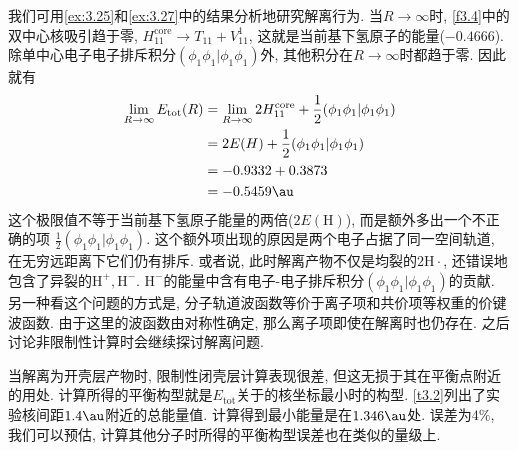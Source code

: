 我们可用\autoref{ex:3.25}和\autoref{ex:3.27}中的结果分析地研究解离行为. 
当$R\to\infty$时, 
\autoref{f3.4}中的双中心核吸引趋于零, 
$H_{11}^\mathrm{core}\to T_{11}+V_{11}^1$, 
这就是当前基下氢原子的能量($-0.4666$). 
除单中心电子电子排斥积分$(\phi_1\phi_1|\phi_1\phi_1)$外, 
其他积分在$R\to \infty$时都趋于零. 
因此就有
\begin{align*}
	\lim_{R\to\infty} E_\mathrm{tot}(R) & = \lim_{R\to\infty} 2H_{11}^\mathrm{core} + \frac{1}{2}(\phi_1\phi_1|\phi_1\phi_1) \\
	& = 2E(H) + \frac{1}{2}(\phi_1\phi_1|\phi_1\phi_1)                                   \\
	& = -0.9332 + 0.3873                                                                 \\
	& = -0.5459\au
\end{align*}
这个极限值不等于当前基下氢原子能量的两倍($2E(\mathrm{H})$), 
而是额外多出一个不正确的项 $\frac{1}{2}(\phi_1\phi_1|\phi_1\phi_1)$. 
这个额外项出现的原因是两个电子占据了同一空间轨道, 
在无穷远距离下它们仍有排斥. 
或者说, 此时解离产物不仅是均裂的$2\mathrm{H}\cdot$, 
还错误地包含了异裂的$\mathrm{H}^+,\mathrm{H}^-$. 
$\mathrm{H}^-$的能量中含有电子-电子排斥积分$(\phi_1\phi_1|\phi_1\phi_1)$的贡献. 
另一种看这个问题的方式是, 
分子轨道波函数等价于离子项和共价项等权重的价键波函数. 
由于这里的波函数由对称性确定, 
那么离子项即使在解离时也仍存在. 
之后讨论非限制性\hft 计算时会继续探讨解离问题.


当解离为开壳层产物时, 
限制性闭壳层\hft 计算表现很差, 
但这无损于其在平衡点附近的用处. 
计算所得的平衡构型就是$E_\mathrm{tot}$关于的核坐标最小时的构型. 
\autoref{t3.2}列出了实验核间距$1.4\au$附近的总能量值. 
计算得到最小能量是在$1.346\au$处. 
误差为$4\%$, 
我们可以预估, 
计算其他分子时所得的平衡构型误差也在类似的量级上. 

